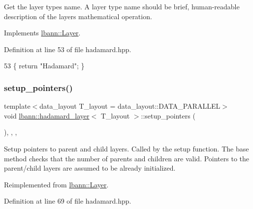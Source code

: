 Get the layer type\textquotesingle{}s name. A layer type name should be brief, human-\/readable description of the layer\textquotesingle{}s mathematical operation. 

Implements \hyperlink{classlbann_1_1Layer_a0fa0ea9160b490c151c0a17fde4f7239}{lbann\+::\+Layer}.



Definition at line 53 of file hadamard.\+hpp.


\begin{DoxyCode}
53 \{ \textcolor{keywordflow}{return} \textcolor{stringliteral}{"Hadamard"}; \}
\end{DoxyCode}
\mbox{\label{classlbann_1_1hadamard__layer_a712faa83429f6a77a6c43c8afde4ddaa}} 
\subsubsection{\texorpdfstring{setup\+\_\+pointers()}{setup\_pointers()}}
{\footnotesize\ttfamily template$<$data\+\_\+layout T\+\_\+layout = data\+\_\+layout\+::\+D\+A\+T\+A\+\_\+\+P\+A\+R\+A\+L\+L\+EL$>$ \\
void \hyperlink{classlbann_1_1hadamard__layer}{lbann\+::hadamard\+\_\+layer}$<$ T\+\_\+layout $>$\+::setup\+\_\+pointers (\begin{DoxyParamCaption}{ }\end{DoxyParamCaption})\hspace{0.3cm}{\ttfamily [inline]}, {\ttfamily [override]}, {\ttfamily [protected]}, {\ttfamily [virtual]}}

Setup pointers to parent and child layers. Called by the setup function. The base method checks that the number of parents and children are valid. Pointers to the parent/child layers are assumed to be already initialized. 

Reimplemented from \hyperlink{classlbann_1_1Layer_a71b7a62afd9b73c23b2c0267b8ba0981}{lbann\+::\+Layer}.



Definition at line 69 of file hadamard.\+hpp.


